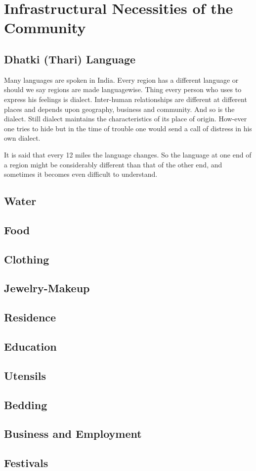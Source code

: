 \chapter{Infrastructural Necessities of the Community}
\section{Dhatki (Thari) Language}
Many languages are spoken in India. Every region has a different language or should we say regions are made languagewise. Thing every person who uses to express his feelings is dialect. Inter-human relationships are different at different places and depends upon geography, business and community. And so is the dialect. Still dialect maintains the characteristics of its place of origin. How-ever one tries to hide but in the time of trouble one would send a call of distress in his own dialect.

It is said that every 12 miles the language changes. So the language at one end of a region might be considerably different than that of the other end, and sometimes it becomes even difficult to understand.
\section{Water}
\section{Food}
\section{Clothing}
\section{Jewelry-Makeup}
\section{Residence}
\section{Education}
\section{Utensils}
\section{Bedding}
\section{Business and Employment}
\section{Festivals}